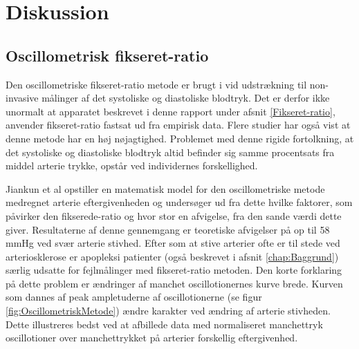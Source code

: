 \chapter{Diskussion}

\section{Oscillometrisk fikseret-ratio}
Den oscillometriske fikseret-ratio metode er brugt i vid udstrækning til non-invasive målinger af det systoliske og diastoliske blodtryk. Det er derfor ikke unormalt at apparatet beskrevet i denne rapport under afsnit \ref{Fikseret-ratio}, anvender fikseret-ratio fastsat ud fra empirisk data. Flere studier har også vist at denne metode har en høj nøjagtighed. Problemet med denne rigide fortolkning, at det systoliske og diastoliske blodtryk altid befinder sig samme procentsats fra middel arterie trykke, opstår ved individernes forskellighed.

Jiankun et al opstiller en matematisk model for den oscillometriske metode medregnet arterie eftergivenheden og undersøger ud fra dette hvilke faktorer, som påvirker den fikserede-ratio og hvor stor en afvigelse, fra den sande værdi dette giver. Resultaterne af denne gennemgang er teoretiske afvigelser på op til 58 mmHg ved svær arterie stivhed. Efter som at stive arterier ofte er til stede ved  arteriosklerose er apopleksi patienter (også beskrevet i afsnit \ref{chap:Baggrund}) særlig udsatte for fejlmålinger med fikseret-ratio metoden. Den korte forklaring på dette problem er ændringer af manchet oscillotionernes kurve brede. Kurven som dannes af peak ampletuderne af oscillotionerne (se figur \ref{fig:OscillometriskMetode}) ændre karakter ved ændring af arterie stivheden. Dette illustreres bedst ved at afbillede data med normaliseret manchettryk oscillotioner over manchettrykket på arterier forskellig eftergivenhed. 

